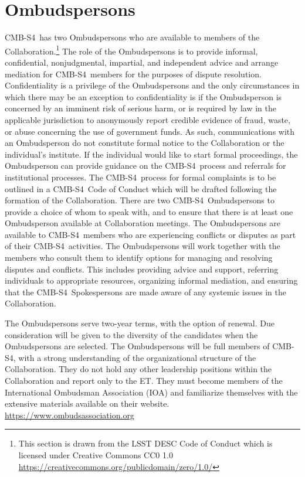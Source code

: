 \documentclass[12pt]{article}
\newcommand{\exec}{{Executive Team}}
\newcommand{\shorte}{{ET}}  %
\newcommand\collabname{CMB-S4}
\begin{document}
\section{Ombudspersons}

\collabname\ has two Ombudspersons who are available to members of the Collaboration.\footnote{This section is drawn from the LSST DESC Code of Conduct which is licensed under Creative Commons CC0 1.0 \url{https://creativecommons.org/publicdomain/zero/1.0/}} The role of the Ombudspersons is to provide informal, confidential, nonjudgmental, impartial, and independent advice and arrange mediation for \collabname\ members for the purposes of dispute resolution. Confidentiality is a privilege of the Ombudspersons and the only circumstances in which there may be an exception to confidentiality is if the Ombudsperson is concerned by an imminent risk of serious harm, or is required by law in the applicable jurisdiction to anonymously report credible evidence of fraud, waste, or abuse concerning the use of government funds. As such, communications with an Ombudsperson do not constitute formal notice to the Collaboration or the individual's institute. If the individual would like to start formal proceedings, the Ombudsperson can provide guidance on the \collabname\ process and referrals for institutional processes. The \collabname\ process for formal complaints is  \textcolor{\markcolor}{to be outlined in a \collabname\ Code of Conduct which will be drafted following the formation of the Collaboration}. There are two \collabname\ Ombudspersons to provide a choice of whom to speak with, and to ensure that there is at least one Ombudsperson available at Collaboration meetings. The Ombudspersons are available to \collabname\ members who are experiencing conflicts or disputes as part of their \collabname\ activities. The Ombudspersons will work together with the members who consult them to identify options for managing and resolving disputes and conflicts. This includes providing advice and support, referring individuals to appropriate resources, organizing informal mediation, and ensuring that the \collabname\ Spokespersons are made aware of any systemic issues in the Collaboration. 

The Ombudspersons serve two-year terms, with the option of renewal. Due consideration will be given to the diversity of the candidates when the Ombudspersons are selected. The Ombudspersons will be full members of \collabname, with a strong understanding of the organizational structure of the Collaboration. They do not hold any other leadership positions within the Collaboration and report only to the \shorte. They must become members of the International Ombudsman Association (IOA) and familiarize themselves with the extensive materials available on their website. \url{https://www.ombudsassociation.org}
\end{document}
